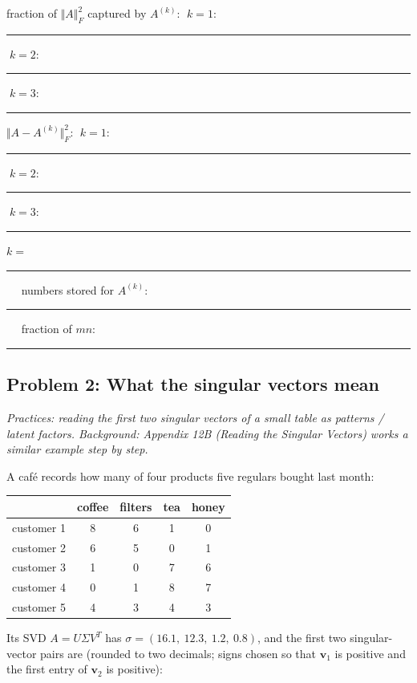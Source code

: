 \documentclass[
  11pt,
]{article}
\newcounter{none} %
\newcommand{\answerspace}[1]{\par\vspace*{#1}}  %
\newcommand{\blank}[1][1.2in]{\rule{#1}{0.4pt}}
\newcommand{\answerpage}{\clearpage}
\begin{document}
fraction of \(\Vert A\Vert_F^2\) captured by \(A^{(k)}\): \(\;k{=}1\):
\blank[0.8in] \(\;k{=}2\): \blank[0.8in] \(\;k{=}3\): \blank[0.8in]

\(\Vert A - A^{(k)}\Vert_F^2\): \(\;k{=}1\): \blank[0.8in] \(\;k{=}2\):
\blank[0.8in] \(\;k{=}3\): \blank[0.8in]

\(k =\) \blank[0.6in] \(\quad\) numbers stored for \(A^{(k)}\):
\blank[0.9in] \(\quad\) fraction of \(mn\): \blank[0.9in]

\answerspace{0.3in}

\answerpage

\subsection{Problem 2: What the singular vectors
mean}\label{problem-2-what-the-singular-vectors-mean}

\emph{Practices: reading the first two singular vectors of a small table
as patterns / latent factors. Background: Appendix 12B (Reading the
Singular Vectors) works a similar example step by step.}

A café records how many of four products five regulars bought last
month:

{\def\LTcaptype{none} %
\begin{longtable}[]{@{}lcccc@{}}
\toprule\noalign{}
& coffee & filters & tea & honey \\
\midrule\noalign{}
\endhead
\bottomrule\noalign{}
\endlastfoot
customer 1 & 8 & 6 & 1 & 0 \\
customer 2 & 6 & 5 & 0 & 1 \\
customer 3 & 1 & 0 & 7 & 6 \\
customer 4 & 0 & 1 & 8 & 7 \\
customer 5 & 4 & 3 & 4 & 3 \\
\end{longtable}
}

Its SVD \(A = U\Sigma V^T\) has \(\sigma = (16.1,\ 12.3,\ 1.2,\ 0.8)\),
and the first two singular-vector pairs are (rounded to two decimals;
signs chosen so that \(\mathbf v_1\) is positive and the first entry of
\(\mathbf v_2\) is positive):
\end{document}
